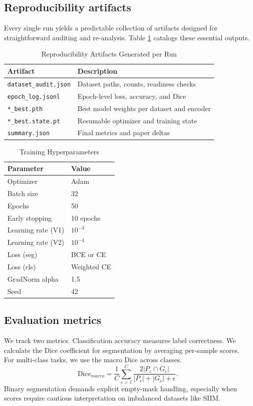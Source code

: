 \documentclass[conference,a4paper]{IEEEtran}
\begin{document}
\subsection{Reproducibility artifacts}
Every single run yields a predictable collection of artifacts designed for straightforward auditing and re-analysis. Table \ref{tab:artifacts} catalogs these essential outputs.
\begin{table}[t]
\centering
\caption{Reproducibility Artifacts Generated per Run}
\label{tab:artifacts}
\begin{tabular}{l l}
\toprule
Artifact & Description \\
\midrule
\texttt{dataset\_audit.json} & Dataset paths, counts, readiness checks \\
\texttt{epoch\_log.jsonl} & Epoch-level loss, accuracy, and Dice \\
\texttt{*\_best.pth} & Best model weights per dataset and encoder \\
\texttt{*\_best.state.pt} & Resumable optimizer and training state \\
\texttt{summary.json} & Final metrics and paper deltas \\
\bottomrule
\end{tabular}
\end{table}
\begin{table}[t]
\centering
\caption{Training Hyperparameters}
\label{tab:hparams}
\begin{tabular}{l l}
\toprule
Parameter & Value \\
\midrule
Optimizer & Adam \\
Batch size & 32 \\
Epochs & 50 \\
Early stopping & 10 epochs \\
Learning rate (V1) & $10^{-3}$ \\
Learning rate (V2) & $10^{-4}$ \\
Loss (seg) & BCE or CE \\
Loss (cls) & Weighted CE \\
GradNorm alpha & 1.5 \\
Seed & 42 \\
\bottomrule
\end{tabular}
\end{table}
\subsection{Evaluation metrics}
We track two metrics. Classification accuracy measures label correctness. We calculate the Dice coefficient for segmentation by averaging per-sample scores. For multi-class tasks, we use the macro Dice across classes.
\begin{equation}
\mathrm{Dice}_{macro} = \frac{1}{C} \sum_{c=1}^C \frac{2|P_c \cap G_c|}{|P_c| + |G_c| + \epsilon}.
\end{equation}
Binary segmentation demands explicit empty-mask handling, especially when scores require cautious interpretation on imbalanced datasets like SIIM.
\end{document}
